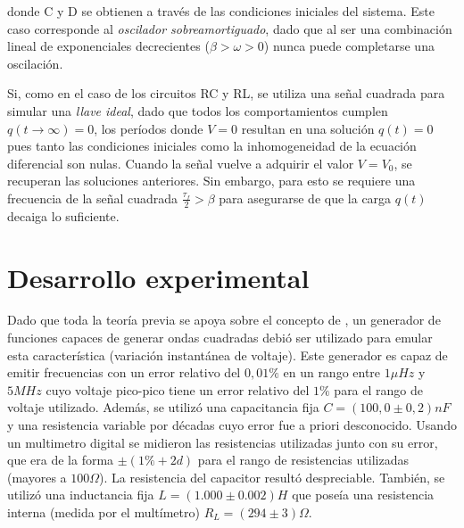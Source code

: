 \documentclass[11pt,a4paper]{article}
\begin{document}
donde C y D se obtienen a través de las condiciones iniciales del sistema. Este caso corresponde al \textit{oscilador sobreamortiguado}, dado que al ser una combinación lineal de exponenciales decrecientes ($\beta > \omega > 0$) nunca puede completarse una oscilación. 

Si, como en el caso de los circuitos RC y RL, se utiliza una señal cuadrada para simular una \textit{llave ideal}, dado que todos los comportamientos cumplen $q(t\rightarrow\infty) = 0$, los períodos donde $V = 0$ resultan en una solución $q(t) = 0$ pues tanto las condiciones iniciales como la inhomogeneidad de la ecuación diferencial son nulas. Cuando la señal vuelve a adquirir el valor $V = V_0$, se recuperan las soluciones anteriores. Sin embargo, para esto se requiere una frecuencia de la señal cuadrada $\frac{\tau_f}{2} > \beta$ para asegurarse de que la carga $q(t)$ decaiga lo suficiente. 



\section{Desarrollo experimental}

Dado que toda la teoría previa se apoya sobre el concepto de , un generador de funciones capaces de generar ondas cuadradas debió ser utilizado para emular esta característica (variación instantánea de voltaje). Este generador es capaz de emitir frecuencias con un error relativo del $0,01\%$ en un rango entre $1\mu Hz$ y $5MHz$ cuyo voltaje pico-pico tiene un error relativo del $1\%$ para el rango de voltaje utilizado. Además, se utilizó una capacitancia fija $C = (100,0 \pm 0,2)nF$ y una resistencia variable por décadas cuyo error fue a priori desconocido. Usando un multimetro digital se midieron las resistencias utilizadas junto con su error, que era de la forma $\pm(1\%+2d)$ para el rango de resistencias utilizadas (mayores a $100\Omega$). La resistencia del capacitor resultó despreciable. También, se utilizó una inductancia fija $L = (1.000 \pm 0.002) H$ que poseía una resistencia interna (medida por el multímetro) $R_L = (294 \pm 3) \Omega$.
\end{document}
